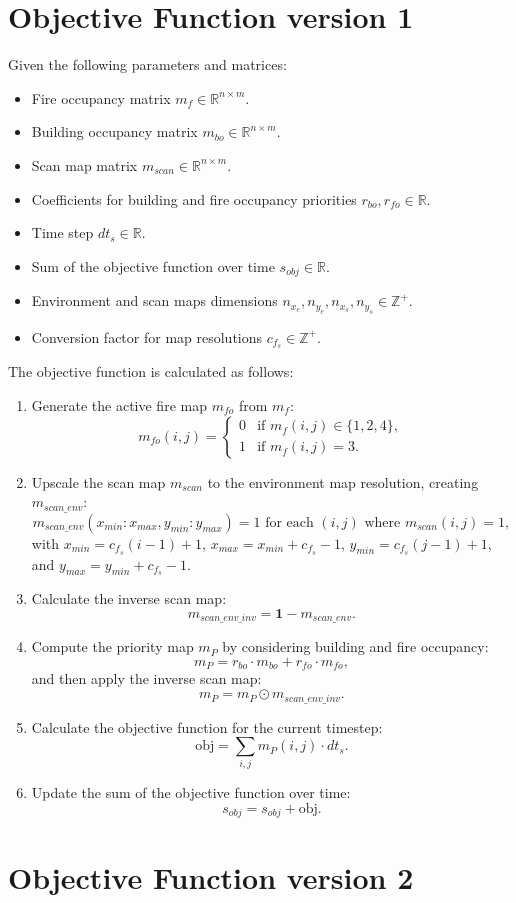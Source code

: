 \documentclass{article}
\begin{document}
\section*{Objective Function version 1}

Given the following parameters and matrices:
\begin{itemize}
    \item Fire occupancy matrix $m_f \in \mathbb{R}^{n \times m}$.
    \item Building occupancy matrix $m_{bo} \in \mathbb{R}^{n \times m}$.
    \item Scan map matrix $m_{scan} \in \mathbb{R}^{n \times m}$.
    \item Coefficients for building and fire occupancy priorities $r_{bo}, r_{fo} \in \mathbb{R}$.
    \item Time step $dt_s \in \mathbb{R}$.
    \item Sum of the objective function over time $s_{obj} \in \mathbb{R}$.
    \item Environment and scan maps dimensions $n_{x_e}, n_{y_e}, n_{x_s}, n_{y_s} \in \mathbb{Z}^+$.
    \item Conversion factor for map resolutions $c_{f_s} \in \mathbb{Z}^+$.
\end{itemize}

The objective function is calculated as follows:

\begin{enumerate}
    \item Generate the active fire map $m_{fo}$ from $m_f$:
    \[ m_{fo}(i,j) = 
    \begin{cases} 
        0 & \text{if } m_f(i,j) \in \{1, 2, 4\}, \\
        1 & \text{if } m_f(i,j) = 3.
    \end{cases} \]

    \item Upscale the scan map $m_{scan}$ to the environment map resolution, creating $m_{scan\_env}$:
    \[ m_{scan\_env}(x_{min}:x_{max}, y_{min}:y_{max}) = 1 \text{ for each }(i, j) \text{ where } m_{scan}(i, j) = 1, \]
    with $x_{min} = c_{f_s}(i-1) + 1$, $x_{max} = x_{min} + c_{f_s} - 1$, $y_{min} = c_{f_s}(j-1) + 1$, and $y_{max} = y_{min} + c_{f_s} - 1$.

    \item Calculate the inverse scan map:
    \[ m_{scan\_env\_inv} = \mathbf{1} - m_{scan\_env}. \]

    \item Compute the priority map $m_P$ by considering building and fire occupancy:
    \[ m_P = r_{bo} \cdot m_{bo} + r_{fo} \cdot m_{fo}, \]
    and then apply the inverse scan map:
    \[ m_P = m_P \odot m_{scan\_env\_inv}. \]

    \item Calculate the objective function for the current timestep:
    \[ \text{obj} = \sum_{i,j} m_P(i,j) \cdot dt_s. \]

    \item Update the sum of the objective function over time:
    \[ s_{obj} = s_{obj} + \text{obj}. \]
\end{enumerate}

\section*{Objective Function version 2}
\end{document}

